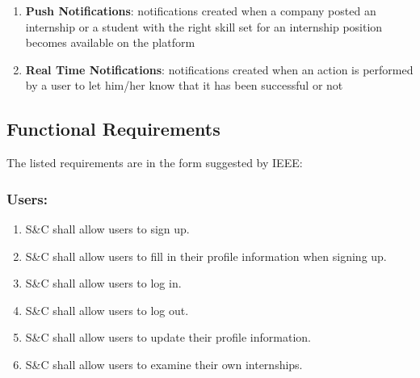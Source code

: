     \begin{enumerate}
        \item  \textbf{Push Notifications}: notifications created when a company posted an internship or a student with the right skill set for an internship position becomes available on the platform
        \item \textbf{Real Time Notifications}: notifications created when an action is performed by a user to let him/her know that it has been successful or not
    \end{enumerate}

\newpage
\subsection{Functional Requirements}
    The listed requirements are in the form suggested by IEEE\cite{502838}: 
    \newline
     \\
    \subsubsection*{Users:}
        \begin{enumerate}[label=\textbf{R\arabic*}]
            \item S\&C shall allow users to sign up.                  
            \item S\&C shall allow users to fill in their profile information when signing up.
            \item S\&C shall allow users to log in.                   
            \item S\&C shall allow users to log out.                  
            \item S\&C shall allow users to update their profile information. 
            \item S\&C shall allow users to examine their own internships.
            \end{enumerate}
        
